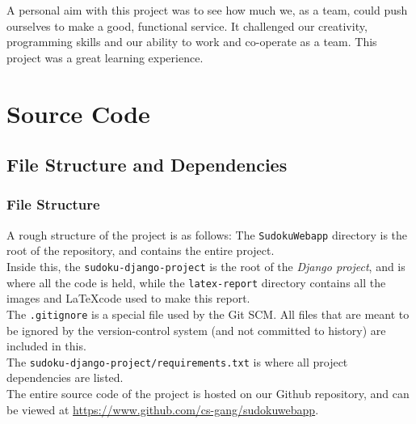 \documentclass[12pt, a4paper]{report}
\begin{document}
  A personal aim with this project was to see how much we, as a team, could push ourselves to make a good, functional service. It challenged our creativity, programming skills and our ability to work and co-operate as a team. This project was a great learning experience.

  
  \newpage
  \section{Source Code}
    \subsection{File Structure and Dependencies}
    \subsubsection{File Structure}
    A rough structure of the project is as follows:
    \vspace{0.5cm}
    The \verb|SudokuWebapp| directory is the root of the repository, and contains the entire project.\\ Inside this, the \verb|sudoku-django-project| is the root of the \emph{Django project}, and is where all the code is held, while the \verb|latex-report| directory contains all the images and \LaTeX code used to make this report.\\
    The \verb|.gitignore| is a special file used by the Git SCM. All files that are meant to be ignored by the version-control system (and not committed to history) are included in this. \\
    The \verb|sudoku-django-project/requirements.txt| is where all project dependencies are listed.\\
    The entire source code of the project is hosted on our Github repository, and can be viewed at \url{https://www.github.com/cs-gang/sudokuwebapp}.
    
\end{document}
